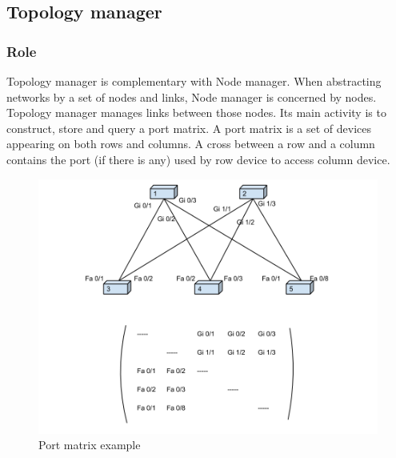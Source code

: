 \subsection{Topology manager}
\subsubsection{Role}
Topology manager is complementary with Node manager. When abstracting networks by a set of nodes and links, Node manager is concerned by nodes. Topology manager manages links between those nodes. Its main activity is to construct, store and query a port matrix. A port matrix is a set of devices appearing on both rows and columns. A cross between a row and a column contains the port (if there is any) used by row device to access column device.
\begin{figure}
    \begin{center}
        \includegraphics[width=400pt]{img/pmatrix.png}
        \caption{Port matrix example}
    \end{center}
\end{figure}

